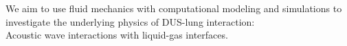 \begin{frame}
  \Large
  We aim to use fluid mechanics with computational modeling and simulations to investigate the underlying physics of DUS-lung interaction:\\
  \vspace*{0.5cm}
  Acoustic wave interactions with liquid-gas interfaces.
\end{frame}
